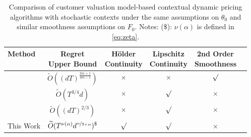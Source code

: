 \begin{table*}[t]
\caption{Comparison of customer valuation model-based contextual dynamic pricing algorithms with stochastic contexts under the same assumptions on $\theta_0$ and similar smoothness assumptions on $F_0$. Notes: 
($\mathdollar$): $\nu(\alpha)$ is defined in \cref{eq:zeta}.}

\label{Comparison}
\centering
\begin{small}
\begin{sc}
\begin{tabular}{lccccc}
\toprule
Method  & \thead{Regret\\ Upper Bound} & \thead{H\"older\\ Continuity}& \thead{Lipschitz\\ Continuity} & \thead{2nd Order\\ Smoothness} \\
\midrule
\citet{fan2021policy}    & $\widetilde{O}((dT)^{\frac{2m+1}{4m-1}} )$ & $\times$ &  $\times$ & $\surd$  \\
\citet{luo2022contextual}  & $\widetilde{O}(T^{3/4} d)$ & $\times$ & $\surd$ & $\times$ \\
\citet{tullii2024improved}  & $\widetilde{O}((dT)^{2/3})$ & $\times$ & $\surd$ & $\times$ \\
This Work & $\widetilde{O}(T^{\nu(\alpha)}d^{\nicefrac{\alpha}{2+\alpha}})^{\mathdollar}$ & $\surd$ & $\surd$ & $\times$ & \\
\bottomrule
\end{tabular}
\end{sc}
\end{small}
\end{table*}